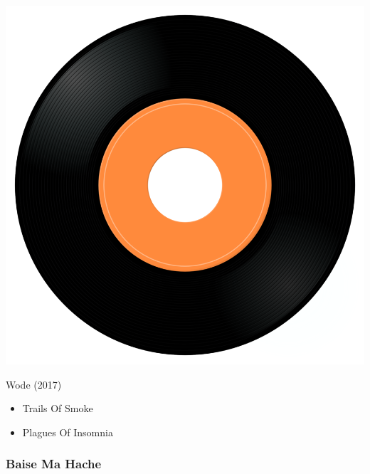 \begin{minipage}[t]{0.25\textwidth}
\captionsetup{type=figure}
\includegraphics[width=\textwidth]{Images/cover.png}
\caption*{Wode (2017)}
\end{minipage}
\begin{minipage}[t]{0.25\textwidth}\vspace{0pt}
\begin{itemize}[nosep,leftmargin=1em,labelwidth=*,align=left]
	\setlength{\itemsep}{0pt}
	\item Trails Of Smoke
	\item Plagues Of Insomnia
\end{itemize}
\end{minipage}

\subsubsection{Baise Ma Hache}

